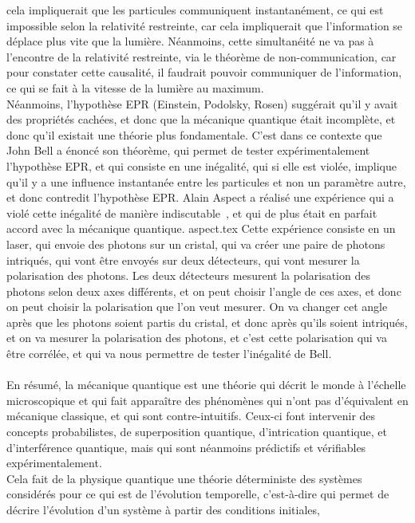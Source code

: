 cela impliquerait que les particules communiquent instantanément, ce qui est impossible selon la relativité
restreinte, car cela impliquerait que l'information se déplace plus vite que la lumière.
Néanmoins, cette simultanéité ne va pas à l'encontre de la relativité restreinte, via le théorème de non-communication,
car pour constater cette causalité, il faudrait pouvoir communiquer de l'information, ce qui se fait à la vitesse
de la lumière au maximum.\\
Néanmoins, l'hypothèse EPR (Einstein, Podolsky, Rosen) suggérait qu'il y avait des propriétés cachées, et donc
que la mécanique quantique était incomplète, et donc qu'il existait une théorie plus fondamentale.
C'est dans ce contexte que John Bell a énoncé son théorème, qui permet de tester expérimentalement l'hypothèse EPR,
et qui consiste en une inégalité, qui si elle est violée, implique qu'il y a une influence instantanée entre les
particules et non un paramètre autre, et donc contredit l'hypothèse EPR.
Alain Aspect a réalisé une expérience qui a violé cette inégalité de manière indiscutable~\cite{wiki:aspect}, et qui de plus était
en parfait accord avec la mécanique quantique.
{aspect.tex}
Cette expérience consiste en un laser, qui envoie des photons sur un cristal, qui va créer une paire de photons
intriqués, qui vont être envoyés sur deux détecteurs, qui vont mesurer la polarisation des photons.
Les deux détecteurs mesurent la polarisation des photons selon deux axes différents, et on peut choisir l'angle
de ces axes, et donc on peut choisir la polarisation que l'on veut mesurer.
On va changer cet angle après que les photons soient partis du cristal, et donc après qu'ils soient intriqués,
et on va mesurer la polarisation des photons, et c'est cette polarisation qui va être corrélée, et qui va nous
permettre de tester l'inégalité de Bell.\\ \\
En résumé, la mécanique quantique est une théorie qui décrit le monde à l'échelle microscopique et qui fait
apparaître des phénomènes qui n'ont pas d'équivalent en mécanique classique, et qui sont contre-intuitifs.
Ceux-ci font intervenir des concepts probabilistes, de superposition quantique, d'intrication quantique, et
d'interférence quantique, mais qui sont néanmoins prédictifs et vérifiables expérimentalement.\\
Cela fait de la physique quantique une théorie déterministe des systèmes considérés pour ce qui est de l’évolution
temporelle, c'est-à-dire qui permet de décrire l’évolution d’un système à partir des conditions initiales,
